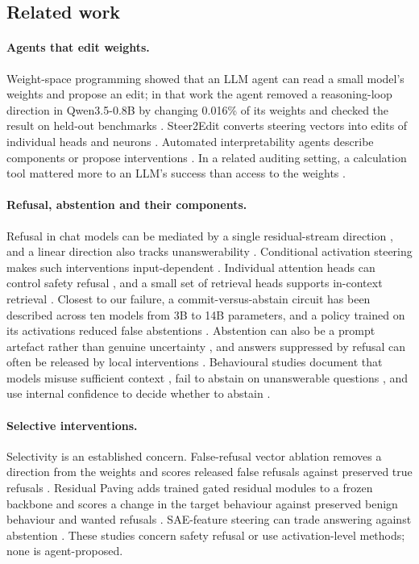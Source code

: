 \subsection{Related work}

\paragraph{Agents that edit weights.}
Weight-space programming showed that an LLM agent can read a small model's weights and propose an edit; in that work
the agent removed a reasoning-loop direction in Qwen3.5-0.8B by changing 0.016\% of its weights and checked the
result on held-out benchmarks \citep{takehi2026wsp}. Steer2Edit converts steering vectors into edits of individual
heads and neurons \citep{steer2edit2026}. Automated interpretability agents describe components or propose
interventions \citep{shaham2024maia,barez2026agenda}. In a related auditing setting, a calculation tool mattered more
to an LLM's success than access to the weights \citep{liu2026auditors}.

\paragraph{Refusal, abstention and their components.}
Refusal in chat models can be mediated by a single residual-stream direction \citep{arditi2024refusal}, and a linear
direction also tracks unanswerability \citep{lavi2025unanswerability}. Conditional activation steering makes such
interventions input-dependent \citep{lee2025cast}. Individual attention heads can control safety refusal
\citep{zhou2025safetyheads}, and a small set of retrieval heads supports in-context retrieval
\citep{wu2025retrievalheads}. Closest to our failure, a commit-versus-abstain circuit has been described across ten
models from 3B to 14B parameters, and a policy trained on its activations reduced false abstentions
\citep{commitabstain2026}. Abstention can also be a prompt artefact rather than genuine uncertainty
\citep{ling2025artifact}, and answers suppressed by refusal can often be released by local interventions
\citep{liu2026broken}. Behavioural studies document that models misuse sufficient context \citep{joren2025sufficient},
fail to abstain on unanswerable questions \citep{kirichenko2025abstentionbench}, and use internal confidence to
decide whether to abstain \citep{kumaran2026confidence}.

\paragraph{Selective interventions.}
Selectivity is an established concern. False-refusal vector ablation removes a direction from the weights and scores
released false refusals against preserved true refusals \citep{wang2025falserefusal}. Residual Paving adds trained
gated residual modules to a frozen backbone and scores a change in the target behaviour against preserved benign
behaviour and wanted refusals \citep{hinkley2026paving}. SAE-feature steering can trade answering against abstention
\citep{hasanov2026drno}. These studies concern safety refusal or use activation-level methods; none is agent-proposed.

